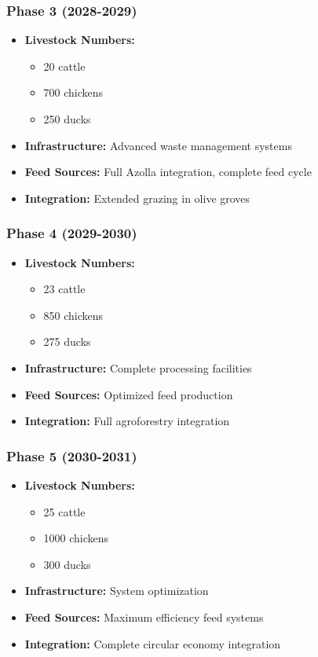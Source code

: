 \subsubsection{Phase 3 (2028-2029)}
\begin{itemize}
    \item \textbf{Livestock Numbers:}
    \begin{itemize}
        \item 20 cattle
        \item 700 chickens
        \item 250 ducks
    \end{itemize}
    \item \textbf{Infrastructure:} Advanced waste management systems
    \item \textbf{Feed Sources:} Full Azolla integration, complete feed cycle
    \item \textbf{Integration:} Extended grazing in olive groves
\end{itemize}

\subsubsection{Phase 4 (2029-2030)}
\begin{itemize}
    \item \textbf{Livestock Numbers:}
    \begin{itemize}
        \item 23 cattle
        \item 850 chickens
        \item 275 ducks
    \end{itemize}
    \item \textbf{Infrastructure:} Complete processing facilities
    \item \textbf{Feed Sources:} Optimized feed production
    \item \textbf{Integration:} Full agroforestry integration
\end{itemize}

\subsubsection{Phase 5 (2030-2031)}
\begin{itemize}
    \item \textbf{Livestock Numbers:}
    \begin{itemize}
        \item 25 cattle
        \item 1000 chickens
        \item 300 ducks
    \end{itemize}
    \item \textbf{Infrastructure:} System optimization
    \item \textbf{Feed Sources:} Maximum efficiency feed systems
    \item \textbf{Integration:} Complete circular economy integration
\end{itemize}

